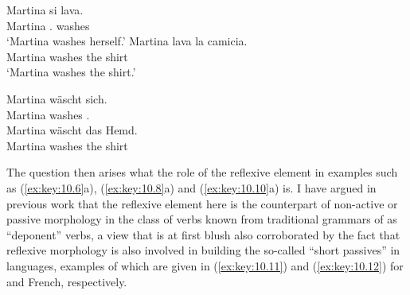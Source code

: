 \documentclass[output=paper]{langsci/langscibook}
\begin{document}
\ea%
    \label{ex:key:10.5} 
    \ea
	\gll  Martina  si      lava.\\
      Martina  \Refl.\Third{}  washes\\
    \glt  ‘Martina washes herself.’
    \ex
	\gll  Martina  lava    la camicia.\\
    Martina  washes  the shirt\\
    \glt ‘Martina washes the shirt.’
    \z
\z\newpage

\ea\label{ex:key:10.6} 
    \z
\z

\ea\label{ex:key:10.7} 
    \ea
	\gll  Martina  wäscht  sich.\\
        Martina  washes  \Refl.\Third{}\\
    \ex
	\gll  Martina  wäscht  das Hemd.\\
        Martina  washes  the shirt\\
    \z
\z

\ea\label{ex:key:10.8} 
    \z
\z

\ea\label{ex:key:10.9}
    \z
\z

\ea\label{ex:key:10.10}
    \z
\z

The question then arises what the role of the reflexive element in examples
such as (\ref{ex:key:10.6}a), (\ref{ex:key:10.8}a) and (\ref{ex:key:10.10}a)
is. I have argued in previous work that the reflexive element here is the
counterpart of non-active or passive morphology in the class of verbs known
from traditional grammars of  as \enquote{deponent} verbs, a view that is
at first blush also corroborated by the fact that reflexive morphology is also
involved in building the so-called “short passives” in  languages,
examples of which are given in (\ref{ex:key:10.11}) and (\ref{ex:key:10.12})
for  and French, respectively.\newpage
\end{document}
